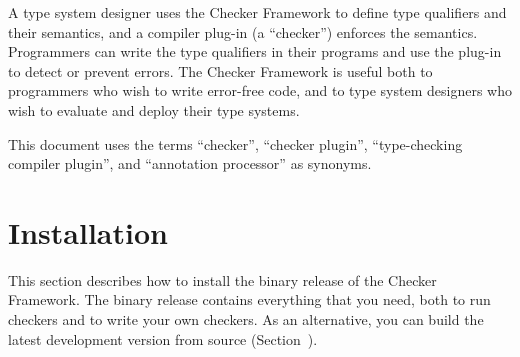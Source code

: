 A type system designer uses the Checker Framework to define type qualifiers
and their semantics, and a
compiler plug-in (a ``checker'') enforces the semantics.  Programmers can
write the type qualifiers in their programs and use the plug-in to detect
or prevent errors.  The Checker Framework is useful both to programmers who
wish to write error-free code, and to type system designers who wish to
evaluate and deploy their type systems.









This document uses the terms ``checker'', ``checker plugin'',
``type-checking compiler plugin'', and ``annotation processor'' as
synonyms.

\section{Installation\label{installation}}

This section describes how to install the binary release of the Checker
Framework.  The binary release contains everything that you need, both to
run checkers and to write your own checkers.  As an alternative, you can
build the latest development version from source
(Section~).

